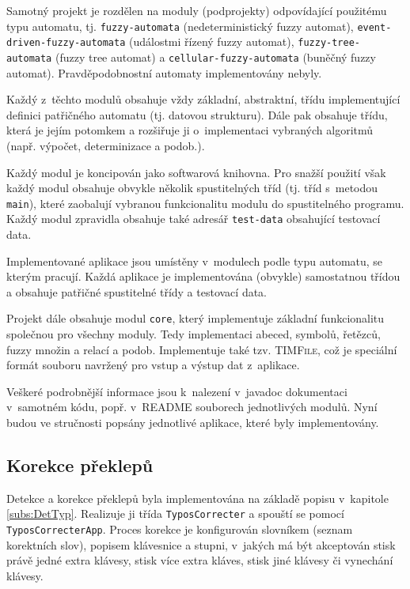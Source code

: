 Samotný projekt je rozdělen na moduly (podprojekty) odpovídající použitému typu automatu, tj. \verb|fuzzy-automata| (nedeterministický fuzzy automat), \verb|event-driven-fuzzy-automata| (událostmi řízený fuzzy automat), \verb|fuzzy-tree-automata| (fuzzy tree automat) a \verb|cellular-fuzzy-automata| (buněčný fuzzy automat). Pravděpodobnostní automaty implementovány nebyly.

Každý z~těchto modulů obsahuje vždy základní, abstraktní, třídu implementující definici patřičného automatu (tj. datovou strukturu). Dále pak obsahuje třídu, která je jejím potomkem a rozšiřuje ji o~implementaci vybraných algoritmů (např. výpočet, determinizace a podob.).

Každý modul je koncipován jako softwarová knihovna. Pro snažší použití však každý modul obsahuje obvykle několik spustitelných tříd (tj. tříd s~metodou \verb|main|), které zaobalují vybranou funkcionalitu modulu do spustitelného programu. Každý modul zpravidla obsahuje také adresář \verb|test-data| obsahující testovací data.

Implementované aplikace jsou umístěny v~modulech podle typu automatu, se kterým pracují. Každá aplikace je implementována (obvykle) samostatnou třídou a obsahuje patřičné spustitelné třídy a testovací data.

Projekt dále obsahuje modul \verb|core|, který implementuje základní funkcionalitu společnou pro všechny moduly. Tedy implementaci abeced, symbolů, řetězců, fuzzy množin a relací a podob. Implementuje také tzv. \textsc{TIMFile}, což je speciální formát souboru navržený pro vstup a výstup dat z~aplikace.

Veškeré podrobnější informace jsou k~nalezení v~javadoc dokumentaci v~samotném kódu, popř. v~\textsc{README} souborech jednotlivých modulů. Nyní budou ve stručnosti popsány jednotlivé aplikace, které byly implementovány.

\subsection{Korekce překlepů}
Detekce a korekce překlepů byla implementována na základě popisu v~kapitole \ref{subs:DetTyp}. Realizuje ji třída \verb|TyposCorrecter| a spouští se pomocí \verb|TyposCorrecterApp|. Proces korekce je konfigurován slovníkem (seznam korektních slov), popisem klávesnice a stupni, v~jakých má být akceptován stisk právě jedné extra klávesy, stisk více extra kláves, stisk jiné klávesy či vynechání klávesy.


